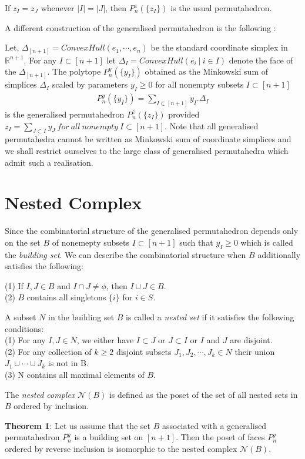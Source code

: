 \documentclass[hidelinks,12pt]{article}
\newcommand{\bea}[1]{\begin{eqnarray}\label{#1} }
\newcommand{\eea}{\end{eqnarray}}
\def\bea{\begin{eqnarray}}
\def\eea{\end{eqnarray}}
\begin{document}
\begin{enumerate}
 If $z_I =z_J$ whenever $|I| =|J|$, then  $ P_n^z(\{ z_I \})$ is the usual permutahedron.
 
 
 A different construction of the generalised permutahedron is the following :
 
 Let, $\Delta_{[n+1]} = ConvexHull(e_1,\cdots,e_n)$ be the standard coordinate simplex in $\mathbb{R}^{n+1}$. For any $I \subset [n+1] $ let $\Delta_I =ConvexHull(e_i~|~i\in I)$ denote the face of the $\Delta_{[n+1]}$. The polytope $P_n^y(\{y_I \})$ obtained as the Minkowski sum of simplices $\Delta_I$ scaled by  parameters $y_I \geq 0$ for all nonempty subsets $I \subset [n+1]$
 \bea
 P_n^y(\{y_I \})= \sum_{I \subset[n+1]} y_I . \Delta_I  \nonumber
 \eea
is the generalised permutahedron $P_n^z(\{z_I \})$  provided $z_I = \sum_{J \subset I} y_J  ~ for ~all~nonempty ~I \subset [n+1]$.
Note that all generalised permutahedra cannot be written as Minkowski sum of coordinate simplices and we shall restrict ourselves to the large class of generalised permutahedra which admit such a realisation.
\section*{Nested Complex}
Since the combinatorial structure of the generalised permutahedron depends only on the set $B$ of nonemepty subsets $I \subset [n+1]$ such that $y_I \geq 0$ which is called the {\it building set}. We can describe the combinatorial structure when $B$ additionally satisfies the following:

\noindent(1) If $I,J \in B$ and $I \cap J \neq \phi $, then $I \cup J \in B$. \\
(2) $B$ contains all singletons $\{ i\}$ for $i \in S$.

A subset $N$ in the building set $B$ is called a {\it nested set} if it satisfies the following conditions:\\
\noindent
(1) For any $I,J \in N$, we either have $I \subset J$ or $J\subset I$ or $I$ and $J$ are disjoint.\\
(2) For any collection of $k \geq 2$ disjoint subsets $J_1,J_2,\cdots, J_k \in N$ their union $J_1 \cup \cdots \cup J_k$ is not in B. \\
(3) N contains all maximal elements of $B$.

The {\it nested complex} $\mathcal{N}(B)$ is defined as the poset of the set of all nested sets in $B$ ordered by inclusion.

{\bf Theorem 1}: Let us assume that the set $B$ associated with a generalised permutahedron $P_n^{y}$ is a building set on $[n+1]$. Then the poset of faces $P_n^{y}$ ordered by reverse inclusion is isomorphic to the nested complex $\mathcal{N}(B)$. 


\end{enumerate}
\end{document}
